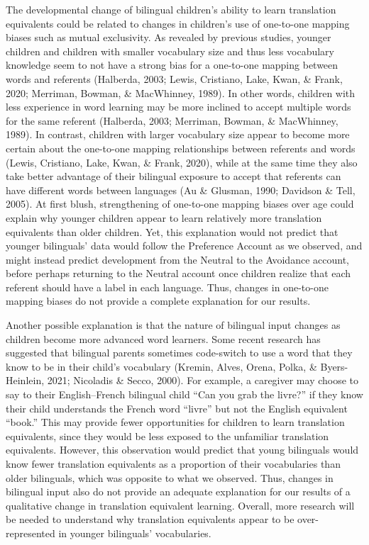 \documentclass[
  english,
  ,man,floatsintext]{apa6}
\begin{document}
The developmental change of bilingual children's ability to learn translation equivalents could be related to changes in children's use of one-to-one mapping biases such as mutual exclusivity. As revealed by previous studies, younger children and children with smaller vocabulary size and thus less vocabulary knowledge seem to not have a strong bias for a one-to-one mapping between words and referents (Halberda, 2003; Lewis, Cristiano, Lake, Kwan, \& Frank, 2020; Merriman, Bowman, \& MacWhinney, 1989). In other words, children with less experience in word learning may be more inclined to accept multiple words for the same referent (Halberda, 2003; Merriman, Bowman, \& MacWhinney, 1989). In contrast, children with larger vocabulary size appear to become more certain about the one-to-one mapping relationships between referents and words (Lewis, Cristiano, Lake, Kwan, \& Frank, 2020), while at the same time they also take better advantage of their bilingual exposure to accept that referents can have different words between languages (Au \& Glusman, 1990; Davidson \& Tell, 2005). At first blush, strengthening of one-to-one mapping biases over age could explain why younger children appear to learn relatively more translation equivalents than older children. Yet, this explanation would not predict that younger bilinguals' data would follow the Preference Account as we observed, and might instead predict development from the Neutral to the Avoidance account, before perhaps returning to the Neutral account once children realize that each referent should have a label in each language. Thus, changes in one-to-one mapping biases do not provide a complete explanation for our results.

Another possible explanation is that the nature of bilingual input changes as children become more advanced word learners. Some recent research has suggested that bilingual parents sometimes code-switch to use a word that they know to be in their child's vocabulary (Kremin, Alves, Orena, Polka, \& Byers-Heinlein, 2021; Nicoladis \& Secco, 2000). For example, a caregiver may choose to say to their English--French bilingual child ``Can you grab the livre?'' if they know their child understands the French word ``livre'' but not the English equivalent ``book.'' This may provide fewer opportunities for children to learn translation equivalents, since they would be less exposed to the unfamiliar translation equivalents. However, this observation would predict that young bilinguals would know fewer translation equivalents as a proportion of their vocabularies than older bilinguals, which was opposite to what we observed. Thus, changes in bilingual input also do not provide an adequate explanation for our results of a qualitative change in translation equivalent learning. Overall, more research will be needed to understand why translation equivalents appear to be over-represented in younger bilinguals' vocabularies.
\end{document}
